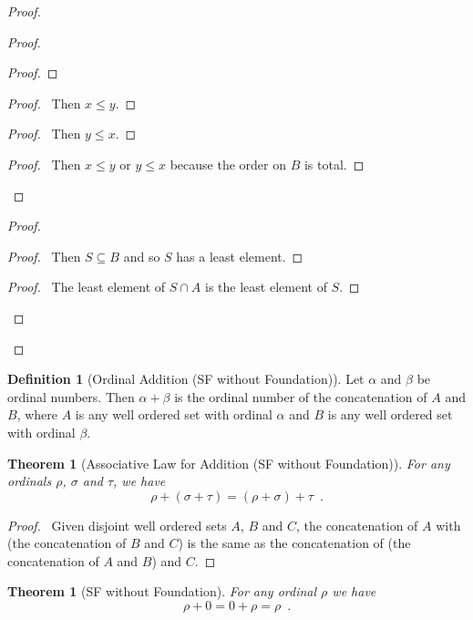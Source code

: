 \documentclass{book}
\let\qed\relax
\newtheorem{thm}[ax]{Theorem}
\theoremstyle{definition}
\newtheorem{df}[ax]{Definition}
\begin{document}
\begin{proof}
\begin{proof}
\begin{proof}
	\end{proof}
	\begin{proof}
		\pf\ Then $x \leq y$.
	\end{proof}
	\begin{proof}
		\pf\ Then $y \leq x$.
	\end{proof}
	\begin{proof}
		\pf\ Then $x \leq y$ or $y \leq x$ because the order on $B$ is total.
	\end{proof}
\end{proof}
\begin{proof}
	\begin{proof}
		\pf\ Then $S \subseteq B$ and so $S$ has a least element.
	\end{proof}
	\begin{proof}
		\pf\ The least element of $S \cap A$ is the least element of $S$.
	\end{proof}
\end{proof}
\qed
\end{proof}

\begin{df}[Ordinal Addition (SF without Foundation)]
Let $\alpha$ and $\beta$ be ordinal numbers. Then $\alpha + \beta$ is the ordinal number of the concatenation of $A$ and $B$, where $A$ is any well ordered set with ordinal $\alpha$ and $B$ is any well ordered set with ordinal $\beta$.
\end{df}

\begin{thm}[Associative Law for Addition (SF without Foundation)]
For any ordinals $\rho$, $\sigma$ and $\tau$, we have
\[ \rho + (\sigma + \tau) = (\rho + \sigma) + \tau \enspace . \]
\end{thm}

\begin{proof}
\pf\ Given disjoint well ordered sets $A$, $B$ and $C$, the concatenation of $A$ with (the concatenation of $B$ and $C$) is the same as the concatenation of (the concatenation of $A$ and $B$) and $C$. \qed
\end{proof}

\begin{thm}[SF without Foundation]
For any ordinal $\rho$ we have
\[ \rho + 0 = 0 + \rho = \rho \enspace . \]
\end{thm}
\end{document}
